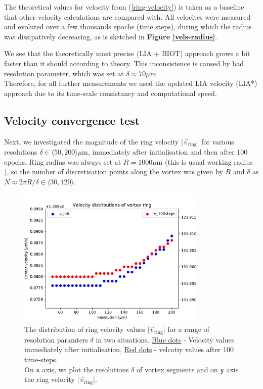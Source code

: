 The theoretical values for velocity from (\ref{ring-velocity}) is taken as a baseline that other velocity calculations are compared with. All velocites were
measured and evoluted over a few thousands epochs (time steps), during which the radius was dissipatively decreasing, as is sketched in \textbf{Figure \ref{vels-radius}}.

We see that the theoretically most precise (LIA + BIOT) approach grows a bit faster than it should according to theory. This inconsistence is caused by bad resolution parameter, which was set at $\delta \approx 70 \mu \unit{m}$\\
Therefore, for all further measurements we used the updated LIA velocity (LIA*) approach due to its time-scale consistancy and computational speed.


\subsection*{Velocity convergence test}

Next, we investigated the magnitude of the ring velocity $\vert \vec{v}_{\text{ring}} \vert$ for various resolutions $\delta \in \langle 50, 200 \rangle \mu\text{m}$, immediately after initialisation and then after 100 epochs. Ring radius was always set at $R=1000\mu\text{m}$ (this is usual working radius \cite{tsubota} \cite{FDclosed}), so the number of discretisation points along the vortex was given by $R$ and $\delta$ as $N \approx 2\pi R/ \delta \in \langle 30,120 \rangle$.

\begin{figure}[h]
	\centering
	\includegraphics[width=0.8\textwidth]{graphics/results/vels_convergence}
	\caption{The distribution of ring velocity values $\vert \vec{v}_{\text{ring}} \vert$ for a range of resolution paramters $\delta$ in two situations. \underline{Blue dots} - Velocity values immediately after initialisation, \underline{Red dots} - velcotiy values after 100 time-steps.\\
	On \texttt{x} axis, we plot the resolutions $\delta$ of vortex segments and on \texttt{y} axis the ring velocity $\vert \vec{v}_{\text{ring}} \vert$.}
	\label{vels-converg}
\end{figure}

